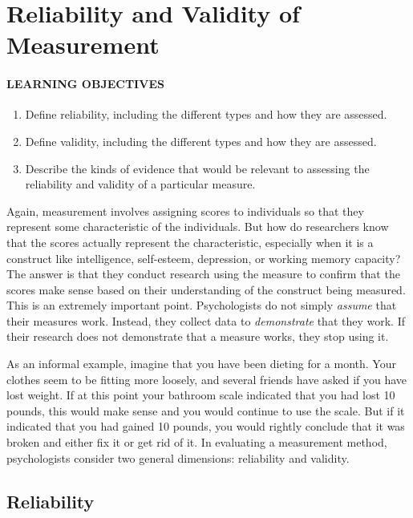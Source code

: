 \documentclass[
]{krantz}
\providecommand{\tightlist}{%
  \setlength{\itemsep}{0pt}\setlength{\parskip}{0pt}}
\begin{document}
\section{Reliability and Validity of Measurement}\label{reliability-and-validity-of-measurement}

\paragraph*{LEARNING OBJECTIVES}\label{learning-objectives-10}

\begin{enumerate}
\def\labelenumi{\arabic{enumi}.}
\tightlist
\item
  Define reliability, including the different types and how they are assessed.
\item
  Define validity, including the different types and how they are assessed.
\item
  Describe the kinds of evidence that would be relevant to assessing the reliability and validity of a particular measure.
\end{enumerate}

Again, measurement involves assigning scores to individuals so that they represent some characteristic of the individuals. But how do researchers know that the scores actually represent the characteristic, especially when it is a construct like intelligence, self-esteem, depression, or working memory capacity? The answer is that they conduct research using the measure to confirm that the scores make sense based on their understanding of the construct being measured. This is an extremely important point. Psychologists do not simply \emph{assume} that their measures work. Instead, they collect data to \emph{demonstrate} that they work. If their research does not demonstrate that a measure works, they stop using it.

As an informal example, imagine that you have been dieting for a month. Your clothes seem to be fitting more loosely, and several friends have asked if you have lost weight. If at this point your bathroom scale indicated that you had lost 10 pounds, this would make sense and you would continue to use the scale. But if it indicated that you had gained 10 pounds, you would rightly conclude that it was broken and either fix it or get rid of it. In evaluating a measurement method, psychologists consider two general dimensions: reliability and validity.

\subsection*{Reliability}\label{reliability}
\end{document}
